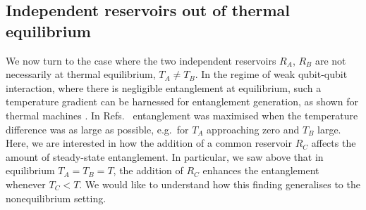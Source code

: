 \documentclass[12pt]{iopart}
\begin{document}
\subsection{Independent reservoirs out of thermal equilibrium}

We now turn to the case where the two independent reservoirs $R_A$, $R_B$ are not necessarily at thermal equilibrium, $T_A \neq T_B$. In the regime of weak qubit-qubit interaction, where there is negligible entanglement at equilibrium, such a temperature gradient can be harnessed for entanglement generation, as shown for thermal machines \cite{Brunner2014,Brask2015,BraskPRE2015,Tavakoli2017}. In Refs.~\cite{Brask2015,Tavakoli2017} entanglement was maximised when the temperature difference was as large as possible, e.g.~for $T_A$ approaching zero and $T_B$ large. Here, we are interested in how the addition of a common reservoir $R_C$ affects the amount of steady-state entanglement. In particular, we saw above that in equilibrium $T_A=T_B=T$, the addition of $R_C$ enhances the entanglement whenever $T_C < T$. We would like to understand how this finding generalises to the nonequilibrium setting.
\end{document}
